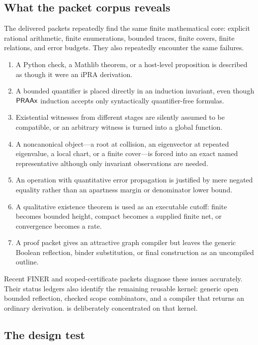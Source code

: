 \subsection{What the packet corpus reveals}

The delivered packets repeatedly find the same finite mathematical core:
explicit rational arithmetic, finite enumerations, bounded traces, finite
covers, finite relations, and error budgets.  They also repeatedly encounter
the same failures.

\begin{enumerate}[label=\textbf{F\arabic*.}]
\item A Python check, a Mathlib theorem, or a host-level proposition is
  described as though it were an iPRA derivation.
\item A bounded quantifier is placed directly in an induction invariant, even
  though \(\mathsf{PRAAx}\) induction accepts only syntactically quantifier-free
  formulas.
\item Existential witnesses from different stages are silently assumed to be
  compatible, or an arbitrary witness is turned into a global function.
\item A noncanonical object---a root at collision, an eigenvector at repeated
  eigenvalue, a local chart, or a finite cover---is forced into an exact named
  representative although only invariant observations are needed.
\item An operation with quantitative error propagation is justified by mere
  negated equality rather than an apartness margin or denominator lower bound.
\item A qualitative existence theorem is used as an executable cutoff: finite
  becomes bounded height, compact becomes a supplied finite net, or convergence
  becomes a rate.
\item A proof packet gives an attractive graph compiler but leaves the generic
  Boolean reflection, binder substitution, or final  construction as
  an uncompiled outline.
\end{enumerate}

Recent FINER and scoped-certificate packets diagnose these issues accurately.
Their status ledgers also identify the remaining reusable kernel: generic open
bounded reflection, checked scope combinators, and a compiler that returns an
ordinary derivation.  \Scope is deliberately concentrated on that kernel.

\subsection{The design test}

